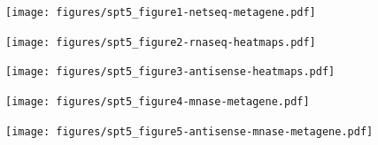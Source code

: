 \documentclass[aspectratio=169]{beamer}
\begin{document}
\begin{frame}
\texttt{[image: figures/spt5\_figure1-netseq-metagene.pdf]}
\end{frame}

\begin{frame}
\texttt{[image: figures/spt5\_figure2-rnaseq-heatmaps.pdf]}
\end{frame}

\begin{frame}
\texttt{[image: figures/spt5\_figure3-antisense-heatmaps.pdf]}
\end{frame}

\begin{frame}
\texttt{[image: figures/spt5\_figure4-mnase-metagene.pdf]}
\end{frame}

\begin{frame}
\texttt{[image: figures/spt5\_figure5-antisense-mnase-metagene.pdf]}
\end{frame}
\end{document}
